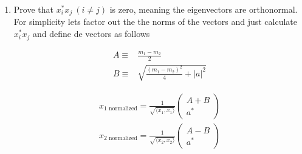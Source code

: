 \documentclass[11pt,letterpaper]{article}%
\newcommand\abs[1]{\left|#1\right|}
\newcommand\inn[2]{\langle#1,#2\rangle}
\begin{document}
\begin{enumerate}[label=\Large{\textbf{\arabic*.}}]
{\begin{enumerate}[label=\textit{\roman*.}]
{Finally diving the vectors from \eqref{eigenvectors} by their norms \eqref{normVV} we can normalize them 
\begin{equation}
\label{normfinal}
\begin{split}
x_{1\text{ normalized}} = \frac{\begin{pmatrix}
\frac{m_1 - m_2}{2} + \sqrt{\frac{(m_1 - m_2)^2}{4} + \abs{a}^2}\\
a^*
\end{pmatrix}}{\sqrt{\frac{(m_1 - m_2)^2}{2} + (m_1 - m_2)\sqrt{\frac{(m_1 - m_2)^2}{4} + \abs{a}^2} + \abs{a}^2}}\\
\\
x_{2\text{ normalized}} = \frac{\begin{pmatrix}
\frac{m_1 - m_2}{2} - \sqrt{\frac{(m_1 - m_2)^2}{4} + \abs{a}^2}\\
a^*
\end{pmatrix}}{\sqrt{\frac{(m_1 - m_2)^2}{2} - (m_1 - m_2)\sqrt{\frac{(m_1 - m_2)^2}{4} + \abs{a}^2} + \abs{a}^2}}
\end{split}
\end{equation}
}

\item{
Prove that $x_i^*x_j\ (i\neq j)$ is zero, meaning the eigenvectors are orthonormal.
For simplicity lets factor out the the norms of the vectors and just calculate $x_i^*x_j$ and define de vectors as follows

\begin{equation}
\label{orthonormal1}
\begin{split}
A \equiv& \frac{m_1 - m_2}{2}\\
B \equiv& \sqrt{\frac{(m_1 - m_2)^2}{4} + \abs{a}^2}
\end{split}
\end{equation}

\begin{equation}
\label{orthonormal2}
\begin{split}
x_{1\text{ normalized}} = \frac{1}{\sqrt{\inn{x_1}{x_1}}}
\begin{pmatrix}
A + B\\
a^*
\end{pmatrix}\\
x_{2\text{ normalized}} = \frac{1}{\sqrt{\inn{x_2}{x_2}}}
\begin{pmatrix}
A - B\\
a^*
\end{pmatrix}
\end{split}
\end{equation}

}
\end{enumerate}}
\end{enumerate}
\end{document}
